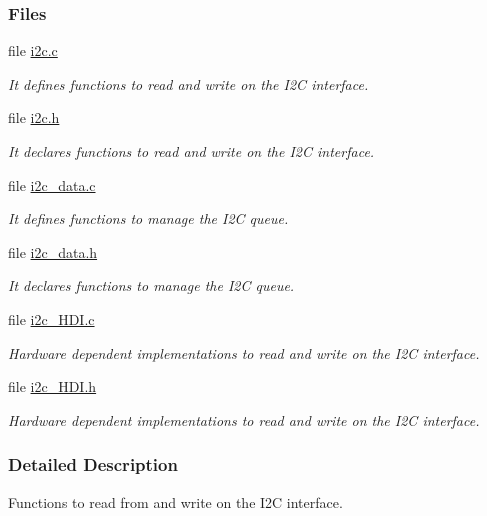 \subsubsection*{Files}
\begin{DoxyCompactItemize}
\item 
file \hyperlink{i2c_8c}{i2c.\+c}
\begin{DoxyCompactList}\small\item\em It defines functions to read and write on the I2\+C interface. \end{DoxyCompactList}\item 
file \hyperlink{i2c_8h}{i2c.\+h}
\begin{DoxyCompactList}\small\item\em It declares functions to read and write on the I2\+C interface. \end{DoxyCompactList}\item 
file \hyperlink{i2c__data_8c}{i2c\+\_\+data.\+c}
\begin{DoxyCompactList}\small\item\em It defines functions to manage the I2\+C queue. \end{DoxyCompactList}\item 
file \hyperlink{i2c__data_8h}{i2c\+\_\+data.\+h}
\begin{DoxyCompactList}\small\item\em It declares functions to manage the I2\+C queue. \end{DoxyCompactList}\item 
file \hyperlink{i2c__HDI_8c}{i2c\+\_\+\+H\+D\+I.\+c}
\begin{DoxyCompactList}\small\item\em Hardware dependent implementations to read and write on the I2\+C interface. \end{DoxyCompactList}\item 
file \hyperlink{i2c__HDI_8h}{i2c\+\_\+\+H\+D\+I.\+h}
\begin{DoxyCompactList}\small\item\em Hardware dependent implementations to read and write on the I2\+C interface. \end{DoxyCompactList}\end{DoxyCompactItemize}


\subsubsection{Detailed Description}
Functions to read from and write on the I2\+C interface. 

